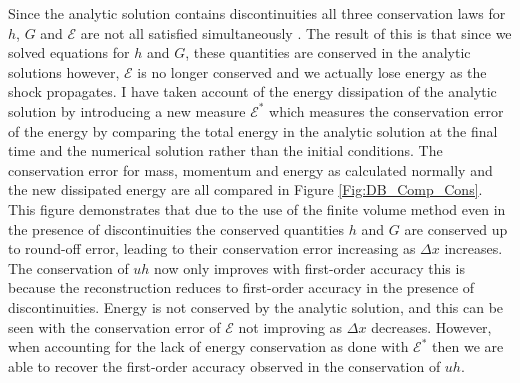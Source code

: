 \documentclass[10pt]{elsarticle}
\begin{document}
Since the analytic solution contains discontinuities all three conservation laws for $h$, $G$ and $\mathcal{E}$ are not all satisfied simultaneously \cite{Pu-2018-1361}. The result of this is that since we solved equations for $h$ and $G$, these quantities are conserved in the analytic solutions however, $\mathcal{E}$ is no longer conserved and we actually lose energy as the shock propagates. I have taken account of the energy dissipation of the analytic solution by introducing a new measure $\mathcal{E}^*$ which measures the conservation error of the energy by comparing the total energy in the analytic solution at the final time and the numerical solution rather than the initial conditions. The conservation error for mass, momentum and energy as calculated normally and the new dissipated energy are all compared in Figure \ref{Fig:DB_Comp_Cons}. This figure demonstrates that due to the use of the finite volume method even in the presence of discontinuities the conserved quantities $h$ and $G$ are conserved up to round-off error, leading to their conservation error increasing as $\Delta x$ increases. The conservation of $uh$ now only improves with first-order accuracy this is because the reconstruction reduces to first-order accuracy in the presence of discontinuities. Energy is not conserved by the analytic solution, and this can be seen with the conservation error of $\mathcal{E}$ not improving as $\Delta x$ decreases. However, when accounting for the lack of energy conservation as done with $\mathcal{E}^*$ then we are able to recover the first-order accuracy observed in the conservation of $uh$.
%
\end{document}
